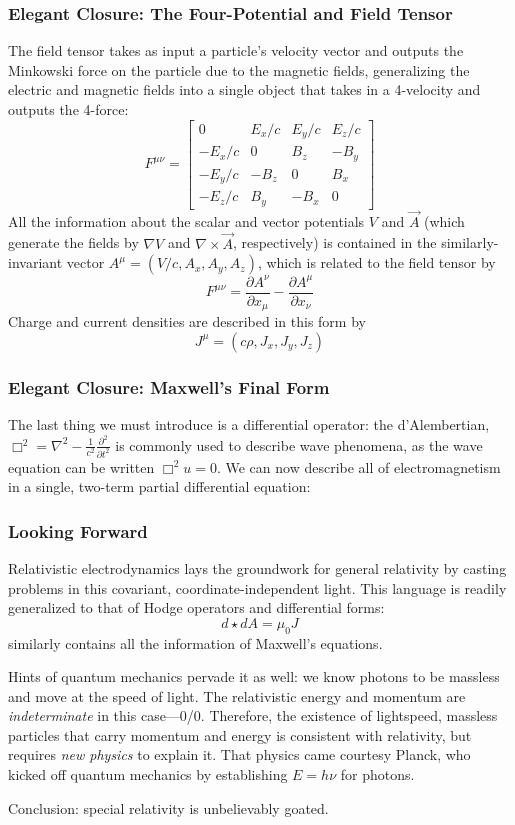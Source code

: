 \documentclass[10pt]{beamer}
\begin{document}
\begin{frame}
  \frametitle{Elegant Closure: The Four-Potential and Field Tensor}
  The field tensor takes as input a particle's velocity vector and outputs the Minkowski force on the particle due to the magnetic fields, generalizing the electric and magnetic fields into a single object
  that takes in a 4-velocity and outputs the 4-force:
  \[
    F^{\mu\nu}=
    \begin{bmatrix}
      0 & E_{x}/c & E_{y}/c & E_{z}/c \\
      -E_{x}/c & 0 & B_{z} & -B_{y} \\
      -E_{y}/c & -B_{z} & 0 & B_{x} \\
      -E_{z}/c & B_{y} & -B_{x} & 0
    \end{bmatrix}
  \]
  All the information about the scalar and vector potentials $V$ and $\vec{A}$ (which generate the fields by $\nabla V$ and $\nabla\times \vec{A}$, respectively) is contained in the similarly-invariant vector $A^{\mu}=(V/c,A_{x},A_{y},A_{z})$,
  which is related to the field tensor by
  \[
    F^{\mu\nu}=\frac{\partial A^{\nu}}{\partial x_{\mu}}-\frac{\partial A^{\mu}}{\partial x_{\nu}}
  \]
  Charge and current densities are described in this form by
  \[
    J^{\mu}=(c\rho,J_{x},J_{y},J_{z})
  \]
\end{frame}

\begin{frame}
  \frametitle{Elegant Closure: Maxwell's Final Form}
  The last thing we must introduce is a differential operator: the d'Alembertian, $\Box^{2}=\nabla^{2}-\frac{1}{c^{2}}\frac{\partial^{2}}{\partial t^{2}}$ is commonly used to describe wave phenomena, as the wave equation can be written $\Box^{2} u=0$.
  We can now describe all of electromagnetism in a single, two-term partial differential equation:
  \begin{center}
  \end{center}
\end{frame}

\begin{frame}
  \frametitle{Looking Forward}
  Relativistic electrodynamics lays the groundwork for general relativity by casting problems in this covariant, coordinate-independent light.
  This language is readily generalized to that of Hodge operators and differential forms:
  \[
    d\star dA = \mu_{0}J
  \]
  similarly contains all the information of Maxwell's equations.

  Hints of quantum mechanics pervade it as well: we know photons to be massless and move at the speed of light.
  The relativistic energy and momentum are \textit{indeterminate} in this case---0/0.
  Therefore, the existence of lightspeed, massless particles that carry momentum and energy is consistent with relativity, but requires \textit{new physics} to explain it.
  That physics came courtesy Planck, who kicked off quantum mechanics by establishing $E=h\nu$ for photons.

  Conclusion: special relativity is unbelievably goated.

\end{frame}
\end{document}
